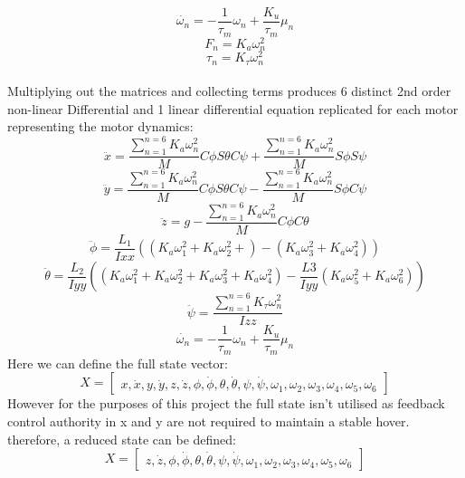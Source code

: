 \documentclass[12pt,a4paper,twoside]{report}
\begin{document}
			\begin{equation} 
				\dot{\omega_n} = -\frac{1}{\tau_m}\omega_n	 + \frac{K_u}{\tau_m}\mu_n
			\end{equation}
			\begin{equation} 
				F_n = K_a \omega_n^2
			\end{equation}
			\begin{equation} 
				\tau_n = K_\tau \omega_n^2
			\end{equation}
				\\
				Multiplying out the matrices and collecting terms produces 6 distinct 2nd order non-linear Differential and 1 linear differential equation replicated for each motor representing the motor dynamics:
				\\
			\begin{equation}
				\ddot{x} = \frac{\sum_{n=1}^{n=6}K_a \omega_n^2}{M}C\phi S\theta C\psi  + \frac{\sum_{n=1}^{n=6}K_a \omega_n^2}{M}S\phi S\psi
			\end{equation}
			\begin{equation}
				\ddot{y} = \frac{\sum_{n=1}^{n=6}K_a \omega_n^2}{M}C\phi S\theta C\psi  - \frac{\sum_{n=1}^{n=6}K_a \omega_n^2}{M}S\phi C\psi
			\end{equation}
			\begin{equation}
				\ddot{z} = g - \frac{\sum_{n=1}^{n=6}K_a \omega_n^2}{M}C\phi C\theta
			\end{equation}
			\begin{equation}
				\ddot{\phi} = \frac{L_1}{Ixx} ((K_a \omega_1^2+K_a \omega_2^2 +) - (K_a \omega_3^2+K_a \omega_4^2))
			\end{equation}
			\begin{equation}
				\ddot{\theta} = \frac{L_2}{Iyy} ((K_a \omega_1^2+K_a \omega_2^2+K_a \omega_3^2+K_a \omega_4^2) - \frac{L3}{Iyy} (K_a \omega_5^2+K_a \omega_6^2))
			\end{equation}
			\begin{equation}
				\ddot{\psi} = \frac{\sum_{n = 1}^{n = 6}K_\tau \omega_n^2}{Izz}
			\end{equation}
			\begin{equation}
				\dot{\omega_n} = -\frac{1}{\tau_m}\omega_n	 + \frac{K_u}{\tau_m}\mu_n
			\end{equation}
				Here we can define the full state vector:
				$$
				X =
				\begin{bmatrix}
					x,\dot{x},y,\dot{y},z,\dot{z},\phi,\dot{\phi},\theta,\dot{\theta},\psi,\dot{\psi},\omega_1,\omega_2,\omega_3,\omega_4,\omega_5,\omega_6
				\end{bmatrix}
				$$
				However for the purposes of this project the full state isn't utilised as feedback control authority in x and y are not required to maintain a stable hover. therefore, a reduced state can be defined: 
				$$
				X =
				\begin{bmatrix}
				z,\dot{z},\phi,\dot{\phi},\theta,\dot{\theta},\psi,\dot{\psi},\omega_1,\omega_2,\omega_3,\omega_4,\omega_5,\omega_6
				\end{bmatrix}
				$$
				
\end{document}
